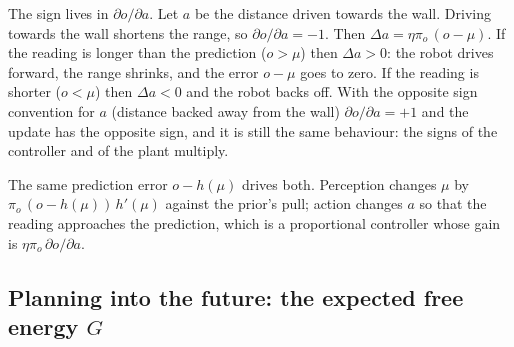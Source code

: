\documentclass[11pt]{article}
\begin{document}
The sign lives in $\partial o/\partial a$. Let $a$ be the distance driven towards the wall. Driving towards the wall shortens the range, so $\partial o/\partial a = -1$. Then $\Delta a = \eta\pi_o\,(o-\mu)$. If the reading is longer than the prediction ($o>\mu$) then $\Delta a>0$: the robot drives forward, the range shrinks, and the error $o-\mu$ goes to zero. If the reading is shorter ($o<\mu$) then $\Delta a<0$ and the robot backs off. With the opposite sign convention for $a$ (distance backed away from the wall) $\partial o/\partial a = +1$ and the update has the opposite sign, and it is still the same behaviour: the signs of the controller and of the plant multiply.

\begin{keyidea}
The same prediction error $o - h(\mu)$ drives both. Perception changes $\mu$ by $\pi_o\,(o-h(\mu))\,h'(\mu)$ against the prior's pull; action changes $a$ so that the reading approaches the prediction, which is a proportional controller whose gain is $\eta\pi_o\,\partial o/\partial a$.
\end{keyidea}

\subsection{Planning into the future: the expected free energy $G$}
\end{document}
